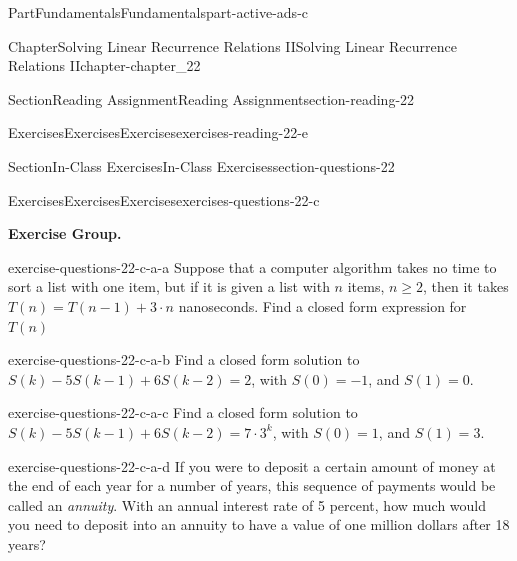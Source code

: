 \documentclass[oneside,10pt,]{book}
\numberwithin{equation}{section}
\begin{document}
\begin{partptx}{Part}{Fundamentals}{}{Fundamentals}{}{}{part-active-ads-c}
\begin{chapterptx}{Chapter}{Solving Linear Recurrence Relations II}{}{Solving Linear Recurrence Relations II}{}{}{chapter-chapter_22}
\begin{sectionptx}{Section}{Reading Assignment}{}{Reading Assignment}{}{}{section-reading-22}
\begin{exercises-subsection-numberless}{Exercises}{Exercises}{}{Exercises}{}{}{exercises-reading-22-e}
\begin{exercisegroup}
\end{exercisegroup}
\par\medskip\noindent
\end{exercises-subsection-numberless}
\end{sectionptx}
%
%
\typeout{************************************************}
\typeout{************************************************}
%
\begin{sectionptx}{Section}{In-Class Exercises}{}{In-Class Exercises}{}{}{section-questions-22}
%
%
%
\typeout{************************************************}
\typeout{************************************************}
%
\begin{exercises-subsection-numberless}{Exercises}{Exercises}{}{Exercises}{}{}{exercises-questions-22-c}
\par\medskip\noindent%
\textbf{Exercise Group.}\space\space%
\begin{exercisegroup}
\begin{divisionexerciseeg}{1}{}{}{exercise-questions-22-c-a-a}%
Suppose that a computer algorithm takes no time to sort a list with one item, but if it is given a list with \(n\) items, \(n \geq 2\), then it takes \(T(n) = T(n-1) + 3\cdot n\) nanoseconds.  Find a closed form expression for \(T(n)\)%
\end{divisionexerciseeg}%
\begin{divisionexerciseeg}{2}{}{}{exercise-questions-22-c-a-b}%
Find a closed form solution to \(S(k) - 5S(k - 1) + 6S(k - 2) = 2\), with \(S(0) = -1\), and \(S(1) = 0\).%
\end{divisionexerciseeg}%
\begin{divisionexerciseeg}{3}{}{}{exercise-questions-22-c-a-c}%
Find a closed form solution to \(S(k) - 5S(k - 1) + 6S(k - 2) = 7 \cdot 3^k\), with \(S(0) = 1\), and \(S(1) = 3\).%
\end{divisionexerciseeg}%
\begin{divisionexerciseeg}{4}{}{}{exercise-questions-22-c-a-d}%
If you were to deposit a certain amount of money at the end of each year for a number of years, this sequence of payments would be called an \emph{annuity}.  With an annual interest rate of 5 percent, how much would you need to deposit into an annuity to have a value of one million dollars after 18 years?%
\end{divisionexerciseeg}%
\end{exercisegroup}
\par\medskip\noindent

\end{exercises-subsection-numberless}
\end{sectionptx}
\end{chapterptx}
\end{partptx}
\end{document}
